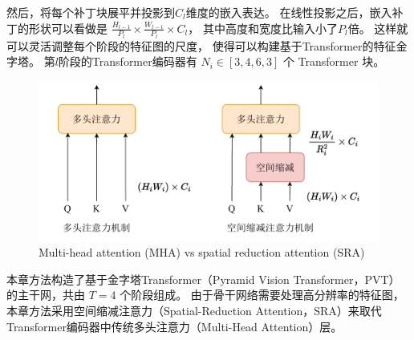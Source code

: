 然后，将每个补丁块展平并投影到$C_{l}$维度的嵌入表达。
在线性投影之后，嵌入补丁的形状可以看做是
$\frac{H_{l-1}}{P_{l}} \times \frac{W_{l-1}}{P_{l}} \times C_{l} $，
其中高度和宽度比输入小了$P_{l}$倍。
这样就可以灵活调整每个阶段的特征图的尺度，
使得可以构建基于Transformer的特征金字塔。
%
%
%
%
第$l$阶段的Transformer编码器有 $ N_{i} \in [3,4,6,3] $ 个 Transformer 块。
%
%
%
%
%
\begin{figure}[!ht]
	\centering
	\includegraphics[width=0.95\linewidth]{figures/chapter3/sra}
	{Multi-head attention (MHA) vs spatial reduction attention (SRA)}  
	\label{cpt3_fig1:sra}
\end{figure}




本章方法构造了基于金字塔Transformer（Pyramid Vision Transformer，PVT）
的主干网，共由 $T = 4$ 个阶段组成。 
由于骨干网络需要处理高分辨率的特征图，
本章方法采用空间缩减注意力（Spatial-Reduction Attention，SRA）来取代Transformer编码器中传统多头注意力（Multi-Head Attention）层。



